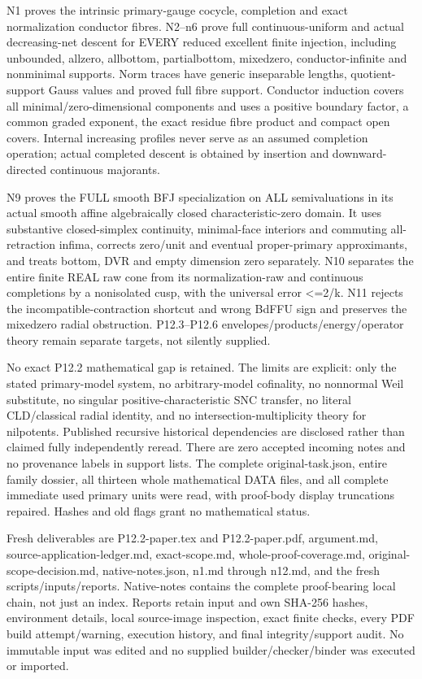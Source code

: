 \documentclass[11pt]{article}
\begin{document}
N1 proves the intrinsic primary-gauge cocycle, completion and exact normalization conductor fibres. N2--n6 prove full continuous-uniform and actual decreasing-net descent for EVERY reduced excellent finite injection, including unbounded, allzero, allbottom, partialbottom, mixedzero, conductor-infinite and nonminimal supports. Norm traces have generic inseparable lengths, quotient-support Gauss values and proved full fibre support. Conductor induction covers all minimal/zero-dimensional components and uses a positive boundary factor, a common graded exponent, the exact residue fibre product and compact open covers. Internal increasing profiles never serve as an assumed completion operation; actual completed descent is obtained by insertion and downward-directed continuous majorants.

N9 proves the FULL smooth BFJ specialization on ALL semivaluations in its actual smooth affine algebraically closed characteristic-zero domain. It uses substantive closed-simplex continuity, minimal-face interiors and commuting all-retraction infima, corrects zero/unit and eventual proper-primary approximants, and treats bottom, DVR and empty dimension zero separately. N10 separates the entire finite REAL raw cone from its normalization-raw and continuous completions by a nonisolated cusp, with the universal error <=2/k. N11 rejects the incompatible-contraction shortcut and wrong BdFFU sign and preserves the mixedzero radial obstruction. P12.3--P12.6 envelopes/products/energy/operator theory remain separate targets, not silently supplied.

No exact P12.2 mathematical gap is retained. The limits are explicit: only the stated primary-model system, no arbitrary-model cofinality, no nonnormal Weil substitute, no singular positive-characteristic SNC transfer, no literal CLD/classical radial identity, and no intersection-multiplicity theory for nilpotents. Published recursive historical dependencies are disclosed rather than claimed fully independently reread. There are zero accepted incoming notes and no provenance labels in support lists. The complete original-task.json, entire family dossier, all thirteen whole mathematical DATA files, and all complete immediate used primary units were read, with proof-body display truncations repaired. Hashes and old flags grant no mathematical status.

Fresh deliverables are P12.2-paper.tex and P12.2-paper.pdf, argument.md, source-application-ledger.md, exact-scope.md, whole-proof-coverage.md, original-scope-decision.md, native-notes.json, n1.md through n12.md, and the fresh scripts/inputs/reports. Native-notes contains the complete proof-bearing local chain, not just an index. Reports retain input and own SHA-256 hashes, environment details, local source-image inspection, exact finite checks, every PDF build attempt/warning, execution history, and final integrity/support audit. No immutable input was edited and no supplied builder/checker/binder was executed or imported.
\end{document}
